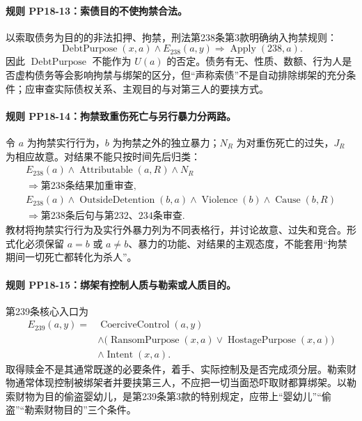 \paragraph{规则 PP18-13：索债目的不使拘禁合法。}
\mbox{}\par
以索取债务为目的的非法扣押、拘禁，刑法第238条第3款明确纳入拘禁规则：
\[
\operatorname{DebtPurpose}(x,a)\land E_{238}(a,y)
\Rightarrow\operatorname{Apply}(238,a).
\]
因此 $\operatorname{DebtPurpose}$ 不能作为 $U(a)$ 的否定。债务有无、性质、数额、行为人是否虚构债务等会影响拘禁与绑架的区分，但“声称索债”不是自动排除绑架的充分条件；应审查实际债权关系、主观目的与对第三人的要挟方式。

\paragraph{规则 PP18-14：拘禁致重伤死亡与另行暴力分两路。}
\mbox{}\par
令 $a$ 为拘禁实行行为，$b$ 为拘禁之外的独立暴力；$N_R$ 为对重伤死亡的过失，$J_R$ 为相应故意。对结果不能只按时间先后归类：
\[
\begin{gathered}
E_{238}(a)\land\operatorname{Attributable}(a,R)\land N_R\\
\Rightarrow\text{第238条结果加重审查},\\
E_{238}(a)\land\operatorname{OutsideDetention}(b,a)
\land\operatorname{Violence}(b)\land\operatorname{Cause}(b,R)\\
\Rightarrow\text{第238条后句与第232、234条审查}.
\end{gathered}
\]
教材将拘禁实行行为及实行外暴力列为不同表格行，并讨论故意、过失和竞合。形式化必须保留 $a=b$ 或 $a\ne b$、暴力的功能、对结果的主观态度，不能套用“拘禁期间一切死亡都转化为杀人”。

\paragraph{规则 PP18-15：绑架有控制人质与勒索或人质目的。}
\mbox{}\par
第239条核心入口为
\[
\begin{aligned}
E_{239}(a,y)={}&\operatorname{CoerciveControl}(a,y)
\\
&\land\bigl(\operatorname{RansomPurpose}(x,a)
\lor\operatorname{HostagePurpose}(x,a)\bigr)\\
&\land\operatorname{Intent}(x,a).
\end{aligned}
\]
取得赎金不是其通常既遂的必要条件，着手、实际控制及是否完成须分层。勒索财物通常体现控制被绑架者并要挟第三人，不应把一切当面恐吓取财都算绑架。以勒索财物为目的偷盗婴幼儿，是第239条第3款的特别规定，应带上“婴幼儿”“偷盗”“勒索财物目的”三个条件。

